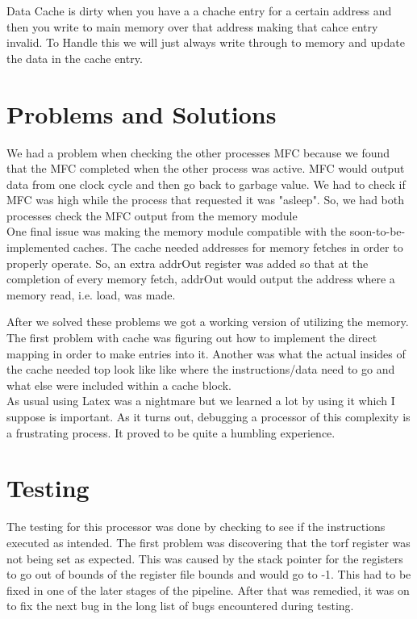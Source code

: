 \documentclass[12pt, twocolumn]{scrartcl}
\begin{document}
Data Cache is dirty when you have a a chache entry for a certain address and then you write to main memory over that address making that cahce entry invalid.  To Handle this we will just always write through to memory and update the data in the cache entry. \\

\section*{Problems and Solutions}
We had a problem when checking the other processes MFC because we found that the MFC completed when the other process was active.  MFC would output data from one clock cycle and then go back to garbage value. We had to check if MFC was high while the process that requested it was "asleep". So, we had both processes check the MFC output from the memory module\\

One final issue was making the memory module compatible with the soon-to-be-implemented caches. The cache needed addresses for memory fetches in order to properly operate. So, an extra addrOut register was added so that at the completion of every memory fetch, addrOut would output the address where a memory read, i.e. load, was made.

After we solved these problems we got a working version of utilizing the memory. \\

The first problem with cache was figuring out how to implement the direct mapping in order to make entries into it. Another was what the actual insides of the cache needed top look like like where the instructions/data need to go and what else were included within a cache block. \\

As usual using Latex was a nightmare but we learned a lot by using it which I suppose is important.
As it turns out, debugging a processor of this complexity is a frustrating process. It proved to be quite a humbling experience.

\section*{Testing}
The testing for this processor was done by checking to see if the instructions executed as intended. The first problem was discovering that the torf register was not being set as expected. This was caused by the stack pointer for the registers to go out of bounds of the register file bounds and would go to -1. This had to be fixed in one of the later stages of the pipeline. After that was remedied, it was on to fix the next bug in the long list of bugs encountered during testing.\\
\end{document}
